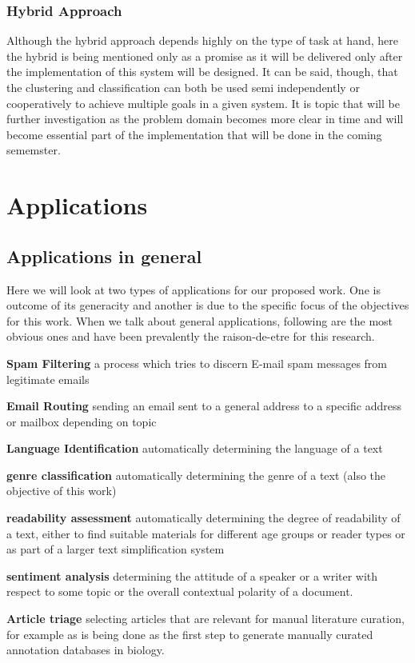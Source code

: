 \documentclass[12pt]{book}
\begin{document}
\subsection{Hybrid Approach}
Although the hybrid approach depends highly on the type of task at hand, here the hybrid is being mentioned only as a promise as it will be delivered only after the implementation of this system will be designed. It can be said, though, that the 
clustering and classification can both be used semi independently or cooperatively to achieve multiple goals in a given system. It is topic that will be further investigation as the problem domain becomes more clear in time and will become essential 
part of the implementation that will be done in the coming sememster.


\chapter{Applications}

\section{Applications in general}
Here we will look at two types of applications for our proposed work. One is outcome of its generacity and another is due to the specific focus of the objectives for this work. When we talk about general applications, following are the most obvious ones and
have been prevalently the raison-de-etre for this research.
\begin{itemize*}
  \item \textbf{Spam Filtering} a process which tries to discern E-mail spam messages from legitimate emails
  \item \textbf{Email Routing} sending an email sent to a general address to a specific address or mailbox depending on topic
  \item \textbf{Language Identification} automatically determining the language of a text
  \item \textbf{genre classification} automatically determining the genre of a text (also the objective of this work)
  \item \textbf{readability assessment} automatically determining the degree of readability of a text, either to find suitable materials for different age groups or reader types or as part of a larger text simplification system 
  \item \textbf{sentiment analysis} determining the attitude of a speaker or a writer with respect to some topic or the overall contextual polarity of a document.
  \item \textbf{Article triage} selecting articles that are relevant for manual literature curation, for example as is being done as the first step to generate manually curated annotation databases in biology.
\end{itemize*}
\end{document}
